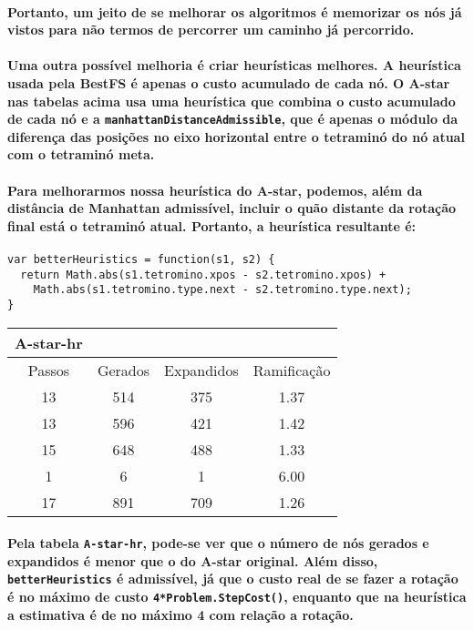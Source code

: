 \documentclass[a4paper,10pt]{article}
\theoremstyle{plain}
\begin{document}
\paragraph{
  Portanto, um jeito de se melhorar os algoritmos é memorizar os nós já vistos para não termos de
percorrer um caminho já percorrido.
}

\paragraph{
  Uma outra possível melhoria é criar heurísticas melhores. A heurística usada pela BestFS é apenas
o custo acumulado de cada nó. O A-star nas tabelas acima usa uma heurística que combina o custo 
acumulado de cada nó e a \texttt{manhattanDistanceAdmissible}, que é apenas o módulo da diferença
das posições no eixo horizontal entre o tetraminó do nó atual com o tetraminó meta.
}

\paragraph{
  Para melhorarmos nossa heurística do A-star, podemos, além da distância de Manhattan admissível,
incluir o quão distante da rotação final está o tetraminó atual. Portanto, a heurística resultante
é:
}

\lstset{language=Java}
\begin{lstlisting}[frame=single]
var betterHeuristics = function(s1, s2) {
  return Math.abs(s1.tetromino.xpos - s2.tetromino.xpos) +
    Math.abs(s1.tetromino.type.next - s2.tetromino.type.next);
}
\end{lstlisting}

\begin{table}[h]
\begin{center}
\begin{tabular}{*{3}{c|}c}
A-star-hr \\
\hline
Passos & Gerados & Expandidos & Ramificação \\
13 & 514 & 375 & 1.37 \\
13 & 596 & 421 & 1.42 \\
15 & 648 & 488 & 1.33 \\
1 & 6 & 1 & 6.00 \\
17 & 891 & 709 & 1.26 \\
\end{tabular}
\end{center}
\end{table}

\paragraph{
  Pela tabela \texttt{A-star-hr}, pode-se ver que o número de nós gerados e expandidos é menor que
o do A-star original. Além disso, \texttt{betterHeuristics} é admissível, já que o custo real de
se fazer a rotação é no máximo de custo \texttt{4*Problem.StepCost()}, enquanto que na heurística
a estimativa é de no máximo 4 com relação a rotação.
} 
\end{document}

